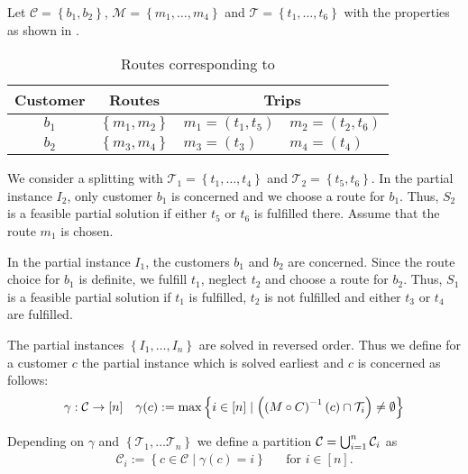 \begin{example}
\label{ex:routechoice}

Let ${\mathcal{C}=\left\{b_1,b_2\right\}}$, ${\mathcal{M}=\left\{m_1,\dots,m_4\right\}}$ and ${\mathcal{T}=\left\{t_1,\dots,t_6\right\}}$ with the properties as shown in .

\begin{table}[htb]
	\centering
	\begin{tabular}{c|cll}
		\toprule
		Customer & Routes & \multicolumn{2}{c}{Trips} \\
		\midrule%
		$b_1$ & $\left\{m_1,m_2\right\}$ & $m_1=\left(t_1,t_5\right)$ & $m_2=\left(t_2,t_6\right)$ \\
		$b_2$ & $\left\{m_3,m_4\right\}$ & $m_3=\left(t_3\right)$ & $m_4=\left(t_4\right)$ \\
		\bottomrule
	\end{tabular}
	\caption{Routes corresponding to }
	\label{tab:routechoice}
\end{table}

We consider a splitting with ${\mathcal{T}_1=\left\{t_1,\dots,t_4\right\}}$ and ${\mathcal{T}_2=\left\{t_5,t_6\right\}}$. In the partial instance $I_2$, only customer $b_1$ is concerned and we choose a route for $b_1$. Thus, $S_2$ is a feasible partial solution if either $t_5$ or $t_6$ is fulfilled there. Assume that the route $m_1$ is chosen. 

In the partial instance $I_1$, the customers $b_1$ and $b_2$ are concerned. Since the route choice for $b_1$ is definite, we fulfill $t_1$, neglect $t_2$ and choose a route for $b_2$. Thus, $S_1$ is a feasible partial solution if $t_1$ is fulfilled, $t_2$ is not fulfilled and either $t_3$ or $t_4$ are fulfilled.

\end{example}

The partial instances $\left\{I_1,\dots,I_n\right\}$ are solved in reversed order. Thus we define for a customer $c$ the partial instance which is solved earliest and $c$ is concerned as follows:
\begin{align*}
	\gamma: \mathcal{C}\to[n] && \gamma(c) := \max\left\{i\in[n]\mid\left(\left(M\circ C\right)^{-1}(c)\cap\mathcal{T}_i\right)\neq\emptyset\right\}
\end{align*}

Depending on $\gamma$ and $\left\{\mathcal{T}_1,\dots\mathcal{T}_n\right\}$ we define a partition ${\mathcal{C}=\bigcup_{i=1}^n \mathcal{C}_i}$ as
\begin{align*}
	\mathcal{C}_i := \left\{c\in\mathcal{C}\mid \gamma(c)=i\right\} && \text{for } i\in[n].
\end{align*}

